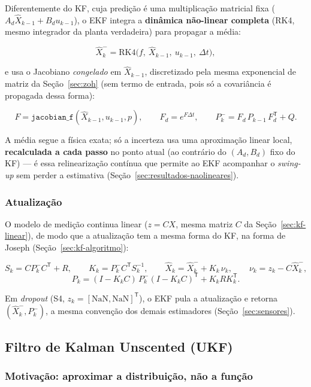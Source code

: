 \documentclass[brazil, 12pt]{article}
\begin{document}
Diferentemente do KF, cuja predição é uma multiplicação matricial fixa
($A_d\hat X_{k-1}+B_d u_{k-1}$), o EKF integra a \textbf{dinâmica não-linear
completa} (RK4, mesmo integrador da planta verdadeira) para propagar a média:

\[
\hat X_k^{-} = \mathrm{RK4}\big(f,\ \hat X_{k-1},\ u_{k-1},\ \Delta t\big),
\]

e usa o Jacobiano \emph{congelado} em $\hat X_{k-1}$, discretizado pela mesma
exponencial de matriz da Seção~\ref{sec:zoh} (sem termo de entrada, pois só a
covariância é propagada dessa forma):

\[
F = \texttt{jacobian\_f}(\hat X_{k-1}, u_{k-1}, p),
\qquad
F_d = e^{F\Delta t},
\qquad
P_k^{-} = F_d\,P_{k-1}\,F_d^{\mathsf T} + Q.
\]

A média segue a física exata; só a incerteza usa uma aproximação linear
local, \textbf{recalculada a cada passo} no ponto atual (ao contrário do
$(A_d,B_d)$ fixo do KF) — é essa relinearização contínua que permite ao EKF
acompanhar o \emph{swing-up} sem perder a estimativa
(Seção~\ref{sec:resultados-naolineares}).

\subsubsection{Atualização}

O modelo de medição continua linear ($z=CX$, mesma matriz $C$ da
Seção~\ref{sec:kf-linear}), de modo que a atualização tem a mesma forma do
KF, na forma de Joseph (Seção~\ref{sec:kf-algoritmo}):

\[
S_k = C P_k^{-} C^{\mathsf T} + R,
\qquad
K_k = P_k^{-} C^{\mathsf T} S_k^{-1},
\qquad
\hat X_k = \hat X_k^{-} + K_k\,\nu_k,
\qquad
\nu_k = z_k - C\hat X_k^{-},
\]
\[
P_k = (I-K_kC)\,P_k^{-}(I-K_kC)^{\mathsf T} + K_k R K_k^{\mathsf T}.
\]

Em \emph{dropout} (S4, $z_k=[\mathrm{NaN},\mathrm{NaN}]^{\mathsf T}$), o EKF
pula a atualização e retorna $(\hat X_k^{-}, P_k^{-})$, a mesma convenção dos
demais estimadores (Seção~\ref{sec:sensores}).

\subsection{Filtro de Kalman Unscented (UKF)}
\label{sec:ukf}

\subsubsection{Motivação: aproximar a distribuição, não a função}
\end{document}
